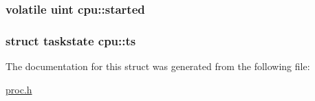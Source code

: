 \subsubsection[{\texorpdfstring{started}{started}}]{\setlength{\rightskip}{0pt plus 5cm}volatile {\bf uint} cpu\+::started}\hypertarget{structcpu_a869f6e0e1dbf69de0bdb3546f981847f}{}\label{structcpu_a869f6e0e1dbf69de0bdb3546f981847f}
\subsubsection[{\texorpdfstring{ts}{ts}}]{\setlength{\rightskip}{0pt plus 5cm}struct {\bf taskstate} cpu\+::ts}\hypertarget{structcpu_a32e7b5aa877171c943d47038e818a159}{}\label{structcpu_a32e7b5aa877171c943d47038e818a159}


The documentation for this struct was generated from the following file\+:\begin{DoxyCompactItemize}
\item 
\hyperlink{proc_8h}{proc.\+h}\end{DoxyCompactItemize}
